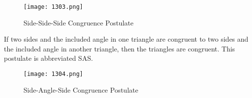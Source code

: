 \begin{figure}[htb!]
  \centering
  \texttt{[image: 1303.png]}
  \caption{Side-Side-Side Congruence Postulate}
\end{figure}

\begin{tcolorbox}[colback=Red!5!white,colframe=Red!75!black,title=Side-Angle-Side Congruence Postulate]
  If two sides and the included angle in one triangle are congruent to two sides and the included angle in another triangle, then the triangles are congruent. This postulate is abbreviated SAS.
\end{tcolorbox}

\begin{figure}[htb!]
  \centering
  \texttt{[image: 1304.png]}
  \caption{Side-Angle-Side Congruence Postulate}
\end{figure}

